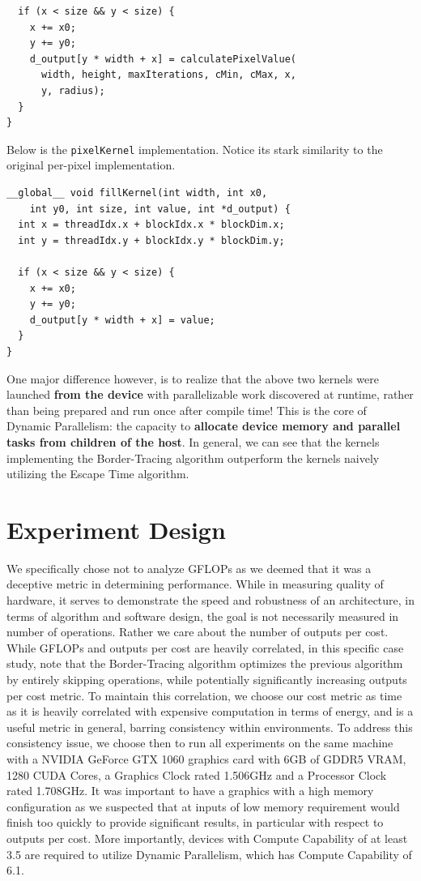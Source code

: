 \documentclass[letterpaper]{article}
\begin{document}
\begin{multicols}{2}
\begin{lstlisting}
  if (x < size && y < size) {
    x += x0;
    y += y0;
    d_output[y * width + x] = calculatePixelValue(
      width, height, maxIterations, cMin, cMax, x, 
      y, radius);
  }
}
\end{lstlisting}

Below is the \texttt{pixelKernel} implementation.
Notice its stark similarity to the original per-pixel implementation.

\begin{lstlisting}
__global__ void fillKernel(int width, int x0, 
    int y0, int size, int value, int *d_output) {
  int x = threadIdx.x + blockIdx.x * blockDim.x;
  int y = threadIdx.y + blockIdx.y * blockDim.y;

  if (x < size && y < size) {
    x += x0;
    y += y0;
    d_output[y * width + x] = value;
  }
}
\end{lstlisting}

One major difference however, is to realize that the above two kernels were
  launched \textbf{from the device} with parallelizable work discovered at 
  runtime, rather than being prepared and run once after compile time! This is
  the core of Dynamic Parallelism: the capacity to \textbf{allocate device
  memory and parallel tasks from children of the host}.
In general, we can see that the kernels implementing the Border-Tracing
  algorithm outperform the kernels naively utilizing the Escape Time algorithm.

  \section{Experiment Design}

We specifically chose not to analyze GFLOPs as we deemed that it was a
  deceptive metric in determining performance. While in measuring quality of
  hardware, it serves to demonstrate the speed and robustness of an
  architecture, in terms of algorithm and software design, the goal is not
  necessarily measured in number of operations. Rather we care about the number
  of outputs per cost. 
While GFLOPs and outputs per cost are heavily correlated, in this specific case
  study, note that the Border-Tracing algorithm optimizes the previous algorithm
  by entirely skipping operations, while potentially significantly increasing
  outputs per cost metric. To maintain this correlation, we choose our cost
  metric as time as it is heavily correlated with expensive computation in terms
  of energy, and is a useful metric in general, barring consistency within
  environments.
To address this consistency issue, we choose then to run all experiments on the
  same machine with a NVIDIA GeForce GTX 1060 graphics card with 6GB of GDDR5
  VRAM, 1280 CUDA Cores, a Graphics Clock rated 1.506GHz and a Processor Clock 
  rated 1.708GHz. It was important to have a graphics with a high memory
  configuration as we suspected that at inputs of low memory requirement would
  finish too quickly to provide significant results, in particular with respect
  to outputs per cost. 
More importantly, devices with Compute Capability of at least 3.5 are required to
  utilize Dynamic Parallelism, which has Compute Capability of 6.1.


\end{multicols}
\end{document}
